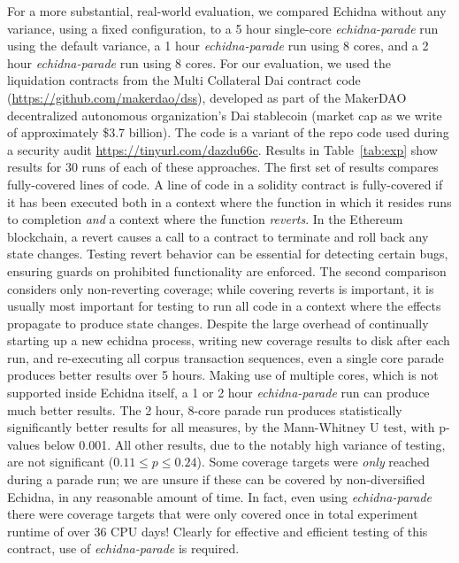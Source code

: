\documentclass[sigconf,screen]{acmart}
\begin{document}
{For a more substantial, real-world evaluation, we compared Echidna without any variance, using a fixed configuration,
to a 5 hour single-core \emph{echidna-parade} run using the default variance,
a 1 hour \emph{echidna-parade} run using 8 cores,
and a 2 hour \emph{echidna-parade} run using 8 cores.  For our evaluation, we
used the liquidation contracts from the Multi Collateral Dai contract code
(\url{https://github.com/makerdao/dss}), developed as part of the
MakerDAO decentralized autonomous organization's Dai stablecoin
(market cap as we write of approximately \$3.7 billion).  The code is
a variant of the repo code used during a security audit \cite{FC20} \url{https://tinyurl.com/dazdu66c}.
Results in Table~\ref{tab:exp} show results for 30 runs of each of
these approaches.  The first set of results compares fully-covered
lines of code.  A line of code in a solidity contract is fully-covered
if it has been executed both in a context where the function in which
it resides runs to completion \emph{and} a context where the function
\emph{reverts}.  In the Ethereum blockchain, a revert causes a
call to a contract to terminate and roll back any state changes.
Testing revert behavior can be essential for detecting certain bugs,
ensuring guards on prohibited functionality are enforced.
The second comparison considers only non-reverting coverage; while
covering reverts is important, it is usually most important for
testing to run all
code in a context where the effects propagate to produce state
changes.  Despite the large overhead of continually starting up a new
echidna process, writing new coverage results to disk after each run,
and re-executing all corpus transaction sequences, even a single core
parade produces better results over 5 hours.  Making use of multiple
cores, which is not supported inside Echidna itself, a 1 or 2 hour
\emph{echidna-parade} run can produce much better results.  The 2 hour,
8-core parade run produces statistically significantly better results
for all measures, by the Mann-Whitney U test, with p-values below
0.001.  All other results, due to the notably high variance of
testing, are not significant ($0.11 \leq p \leq 0.24$).  Some coverage
targets were \emph{only} reached during a parade run; we are unsure if
these can be covered by non-diversified Echidna, in any reasonable
amount of time.  In fact, even using \emph{echidna-parade} there were coverage targets that were only covered once in total experiment runtime of over 36 CPU days!  Clearly for
effective and efficient testing of this contract, use of \emph{echidna-parade} is
required.

}
\end{document}
